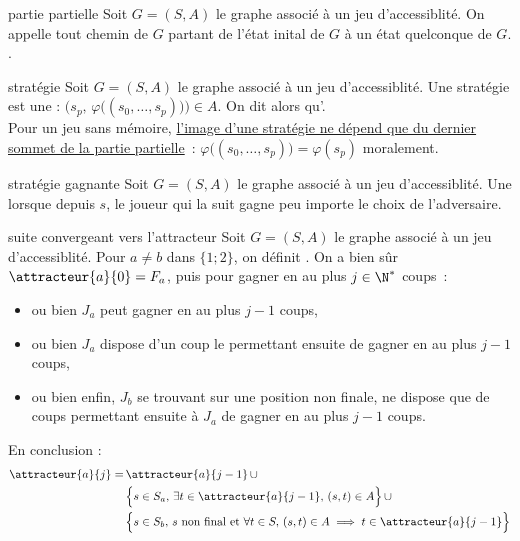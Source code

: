 \begin{adjustwidth}{-3cm}{-3cm}
\begin{definition}{4.6}{partie partielle}
    Soit $G = (S,A)$ le graphe associé à un jeu d'accessiblité. On appelle  tout chemin de $G$ partant de l'état inital de $G$ à un état quelconque de $G$. .
\end{definition}

\begin{definition}{4.7}{stratégie}
    Soit $G = (S,A)$ le graphe associé à un jeu d'accessiblité. Une stratégie est une  : $\Big(s_p,\,  \varphi\big((s_0, \dots, s_p)\big)\Big) \in A$. On dit alors qu'. \\
    Pour un jeu sans mémoire, \underline{l'image d'une stratégie ne dépend que du dernier sommet de la partie partielle}~: $\varphi\big((s_0, \dots, s_p)\big) = \varphi(s_p)$ moralement.
\end{definition}

\begin{definition}{4.8}{stratégie gagnante}
    Soit $G = (S,A)$ le graphe associé à un jeu d'accessiblité. Une  lorsque depuis $s$, le joueur qui la suit gagne peu importe le choix de l'adversaire.
\end{definition}

\begin{definition}{4.9}{suite convergeant vers l'attracteur}
    Soit $G = (S,A)$ le graphe associé à un jeu d'accessiblité. Pour $a \neq b$ dans $\{1;2\}$, on définit . On a bien sûr $\attracteur{a}{0} = F_a$, puis pour gagner en au plus $j \in \N^*$ coups~:
    \begin{itemize}
        \item ou bien $J_a$ peut gagner en au plus $j-1$ coups,
        \item ou bien $J_a$ dispose d'un coup le permettant ensuite de gagner en au plus $j-1$ coups,
        \item ou bien enfin, $J_b$ se trouvant sur une position non finale, ne dispose que de coups permettant ensuite à $J_a$ de gagner en au plus $j-1$ coups.
    \end{itemize}
    En conclusion :
    \begin{align*}
        \attracteur{a}{j} = \,&\attracteur{a}{j-1} \,\cup \\
        &\Big\{s \in S_a,\, \exists t \in \attracteur{a}{j-1},\,  (s,t) \in A\Big\} \, \cup\\
        &\Big\{s \in S_b,\,s \text{ non final et } \forall t \in S,\, (s,t) \in A \implies t \in \attracteur{a}{j-1}\Big\}
    \end{align*} 
\end{definition}


\end{adjustwidth}
